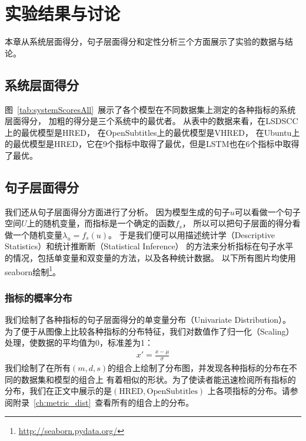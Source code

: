 
\chapter{实验结果与讨论}\label{ch:experiment}
本章从系统层面得分，句子层面得分和定性分析三个方面展示了实验的数据与结论。

\section{系统层面得分}\label{sec:system_scores}
图~\ref{tab:systemScoresAll}~展示了各个模型在不同数据集上测定的各种指标的系统层面得分，
加粗的得分是三个系统中的最优者。
从表中的数据来看，在LSDSCC上的最优模型是HRED，
在OpenSubtitles上的最优模型是VHRED，
在Ubuntu上的最优模型是HRED，它在9个指标中取得了最优，但是LSTM也在6个指标中取得了最优。



\section{句子层面得分}\label{sec:utterance_scores}
我们还从句子层面得分方面进行了分析。
因为模型生成的句子$u$可以看做一个句子空间$U$上的随机变量，而指标是一个确定的函数$f_{s}$，
所以可以把句子层面的得分看做一个随机变量$\lambda_u = f_{s}(u)$。
于是我们便可以用描述统计学（Descriptive Statistics）和统计推断断（Statistical Inference）
的方法来分析指标在句子水平的情况，包括单变量和双变量的方法，以及各种统计数据。
以下所有图片均使用seaborn绘制\footnote{\url{http://seaborn.pydata.org/}}。

\subsection{指标的概率分布}\label{subsec:metric_distribution}
我们绘制了各种指标的句子层面得分的单变量分布（Univariate Distribution）。
为了便于从图像上比较各种指标的分布特征，我们对数值作了归一化（Scaling）处理，使数据的平均值为0，标准差为1：
\begin{align}
    x' = \frac{x - \mu}{\sigma}
\end{align}
我们绘制了在所有$(m, d, s)$的组合上绘制了分布图，并发现各种指标的分布在不同的数据集和模型的组合上
有着相似的形状。为了使读者能迅速检阅所有指标的分布，我们在正文中展示的是$(\text{HRED}, \text{OpenSubtitles})$
上各项指标的分布。请参阅附录~\ref{ch:metric_dist}~查看所有的组合上的分布。

